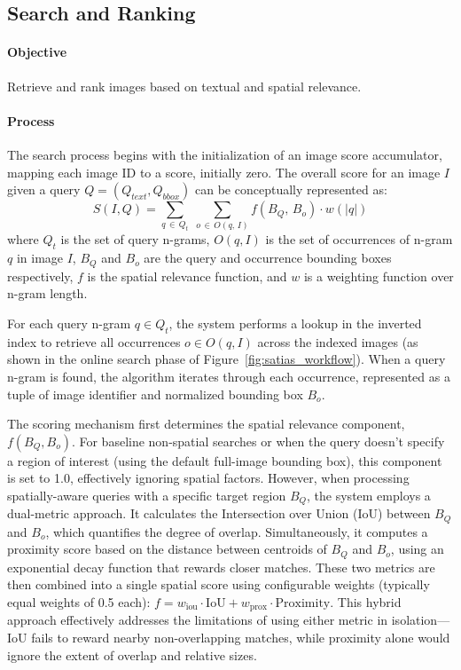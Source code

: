 \documentclass[sigconf,screen]{acmart}
\begin{document}
\subsection{Search and Ranking}

\paragraph{Objective} Retrieve and rank images based on textual and spatial relevance.

\paragraph{Process} The search process begins with the initialization of an image score accumulator, mapping each image ID to a score, initially zero. The overall score for an image $I$ given a query $Q = (Q_{text}, Q_{bbox})$ can be conceptually represented as:
\[
    S(I, Q) = \sum_{q \,\in\, Q_t} \;\sum_{o \,\in\, O(q,\, I)}
    f\!\left(B_Q,\, B_o\right) \cdot w\!\left(\lvert q \rvert\right)
\]
where $Q_t$ is the set of query n-grams, $O(q, I)$ is the set of occurrences of n-gram $q$ in image $I$, $B_Q$ and $B_o$ are the query and occurrence bounding boxes respectively, $f$ is the spatial relevance function, and $w$ is a weighting function over n-gram length.

For each query n-gram $q \in Q_t$, the system performs a lookup in the inverted index to retrieve all occurrences $o \in O(q, I)$ across the indexed images (as shown in the online search phase of Figure~\ref{fig:satias_workflow}). When a query n-gram is found, the algorithm iterates through each occurrence, represented as a tuple of image identifier and normalized bounding box $B_o$.

The scoring mechanism first determines the spatial relevance component, $f(B_Q, B_o)$. For baseline non-spatial searches or when the query doesn't specify a region of interest (using the default full-image bounding box), this component is set to 1.0, effectively ignoring spatial factors. However, when processing spatially-aware queries with a specific target region $B_Q$, the system employs a dual-metric approach. It calculates the Intersection over Union (IoU) between $B_Q$ and $B_o$, which quantifies the degree of overlap. Simultaneously, it computes a proximity score based on the distance between centroids of $B_Q$ and $B_o$, using an exponential decay function that rewards closer matches. These two metrics are then combined into a single spatial score using configurable weights (typically equal weights of 0.5 each): $f = w_{\text{iou}} \cdot \text{IoU} + w_{\text{prox}} \cdot \text{Proximity}$. This hybrid approach effectively addresses the limitations of using either metric in isolation—IoU fails to reward nearby non-overlapping matches, while proximity alone would ignore the extent of overlap and relative sizes.
\end{document}
